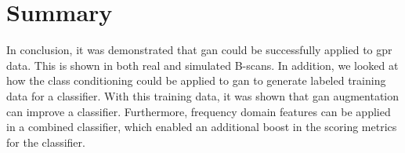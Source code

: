 \section{Summary}
\hspace{0.5in}In conclusion, it was demonstrated that \acrshort{gan} could be successfully applied to \acrshort{gpr} data. This is shown in both real and simulated B-scans. In addition, we looked at how the class conditioning could be applied to \acrshort{gan} to generate labeled training data for a classifier. With this training data, it was shown that \acrshort{gan} augmentation can improve a classifier. Furthermore, frequency domain features can be applied in a combined classifier, which enabled an additional boost in the scoring metrics for the classifier.